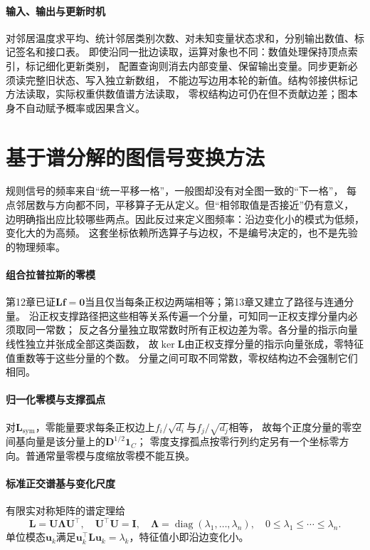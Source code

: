\paragraph{输入、输出与更新时机}
对邻居温度求平均、统计邻居类别次数、对未知变量状态求和，分别输出数值、标记签名和接口表。
即使沿同一批边读取，运算对象也不同：数值处理保持顶点索引，标记细化更新类别，
配置查询则消去内部变量、保留输出变量。同步更新必须读完整旧状态、写入独立新数组，
不能边写边用本轮的新值。结构邻接供标记方法读取，实际权重供数值谱方法读取，
零权结构边可仍在但不贡献边差；图本身不自动赋予概率或因果含义。

\section{基于谱分解的图信号变换方法}
\label{sec:signal-analysis-graph-state-kernels}

规则信号的频率来自“统一平移一格”，一般图却没有对全图一致的“下一格”，
每点邻居数与方向都不同，平移算子无从定义。但“相邻取值是否接近”仍有意义，
边明确指出应比较哪些两点。因此反过来定义图频率：沿边变化小的模式为低频，变化大的为高频。
这套坐标依赖所选算子与边权，不是编号决定的，也不是先验的物理频率。

\paragraph{组合拉普拉斯的零模}
第12章已证$\bm L\bm f=\bm0$当且仅当每条正权边两端相等；第13章又建立了路径与连通分量。
沿正权支撑路径把这些相等关系传遍一个分量，可知同一正权支撑分量内必须取同一常数；
反之各分量独立取常数时所有正权边差为零。各分量的指示向量线性独立并张成全部这类函数，
故$\ker\bm L$由正权支撑分量的指示向量张成，零特征值重数等于这些分量的个数。
分量之间可取不同常数，零权结构边不会强制它们相同。

\paragraph{归一化零模与支撑孤点}
对$\bm L_{\mathrm{sym}}$，零能量要求每条正权边上$f_i/\sqrt{d_i}$与$f_j/\sqrt{d_j}$相等，
故每个正度分量的零空间基向量是该分量上的$\bm D^{1/2}\bm1_C$；
零度支撑孤点按零行列约定另有一个坐标零方向。普通常量零模与度缩放零模不能互换。

\paragraph{标准正交谱基与变化尺度}
有限实对称矩阵的谱定理给
\[
  \bm L=\bm U\bm\Lambda\bm U^\top,\quad \bm U^\top\bm U=\bm I,\quad
  \bm\Lambda=\operatorname{diag}(\lambda_1,\ldots,\lambda_n),\quad 0\leq\lambda_1\leq\cdots\leq\lambda_n.
\]
单位模态$\bm u_k$满足$\bm u_k^\top\bm L\bm u_k=\lambda_k$，特征值小即沿边变化小。

